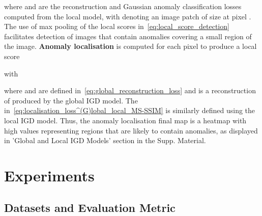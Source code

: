\documentclass[letterpaper]{article} \usepackage{aaai22}  \usepackage{times}  \usepackage{helvet}  \usepackage{courier}  \usepackage[hyphens]{url}  \usepackage{graphicx} \urlstyle{rm} \def\UrlFont{\rm}  \usepackage{natbib}  \usepackage{caption} \DeclareCaptionStyle{ruled}{labelfont=normalfont,labelsep=colon,strut=off} \frenchspacing  \setlength{\pdfpagewidth}{8.5in}  \setlength{\pdfpageheight}{11in}  \usepackage{algorithm}
\begin{document}
where  and  are the reconstruction and Gaussian anomaly classification losses computed from the local model, with  denoting an image patch of size  at pixel .
The use of max pooling of the local scores in~\eqref{eq:local_score_detection} facilitates detection of images that contain anomalies covering a small region of the image.
\textbf{Anomaly localisation} is computed for each pixel  to produce a local score   

with

where  and  are defined in~\eqref{eq:global_reconstruction_loss} and 
 is a reconstruction of  produced by the global IGD model. The  in~\eqref{eq:localisation_loss^(G)lobal_local_MS-SSIM} is similarly defined using the local IGD model.
Thus, the anomaly localisation final map is a 
heatmap with high values representing regions that are likely to contain anomalies, as displayed in 'Global and Local IGD Models' section in the Supp. Material.







\section{Experiments}
\label{sec:datasets_evaluation}

\subsection{Datasets and Evaluation Metric}
\end{document}
